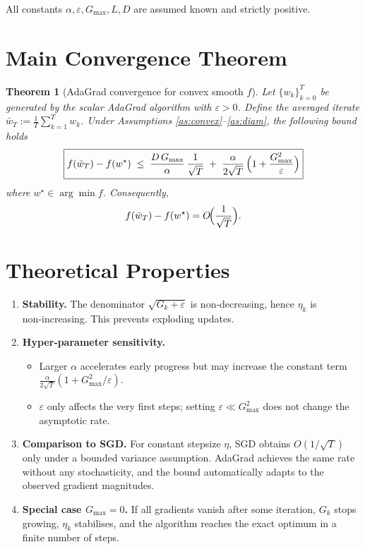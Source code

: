 \documentclass{article}
\newtheorem{theorem}{Theorem}
\begin{document}
All constants $\alpha,\varepsilon,G_{\max},L,D$ are assumed known and
strictly positive.

\section*{Main Convergence Theorem}
\begin{theorem}[AdaGrad convergence for convex smooth $f$]\label{thm:main}
Let $\{w_k\}_{k=0}^{T}$ be generated by the scalar AdaGrad algorithm with
$\varepsilon>0$.
Define the averaged iterate $\bar w_T:=\frac{1}{T}\sum_{k=1}^{T} w_k$.
Under Assumptions \ref{as:convex}–\ref{as:diam}, the following bound holds
\[
\boxed{
f(\bar w_T)-f(w^{\star})
\;\le\;
\frac{D\,G_{\max}}{\alpha}\,
\frac{1}{\sqrt{T}} \;+\;
\frac{\alpha}{2\sqrt{T}}\,
\Bigl(1+\frac{G_{\max}^{2}}{\varepsilon}\Bigr)
}
\]
where $w^{\star}\in\arg\min f$.
Consequently,
\[
f(\bar w_T)-f(w^{\star}) = O\!\Bigl(\frac{1}{\sqrt{T}}\Bigr).
\]
\end{theorem}

\section*{Theoretical Properties}
\begin{enumerate}[label=\arabic*.]
\item \textbf{Stability.} The denominator $\sqrt{G_k+\varepsilon}$ is non‑decreasing,
hence $\eta_k$ is non‑increasing. This prevents exploding updates.
\item \textbf{Hyper‑parameter sensitivity.}
\begin{itemize}
\item Larger $\alpha$ accelerates early progress but may increase the constant
term $\frac{\alpha}{2\sqrt{T}}(1+G_{\max}^{2}/\varepsilon)$.
\item $\varepsilon$ only affects the very first steps; setting $\varepsilon\ll G_{\max}^{2}$
does not change the asymptotic rate.
\end{itemize}
\item \textbf{Comparison to SGD.}
For constant stepsize $\eta$, SGD obtains $O(1/\sqrt{T})$ only under a
bounded variance assumption. AdaGrad achieves the same rate without
any stochasticity, and the bound automatically adapts to the observed
gradient magnitudes.
\item \textbf{Special case $G_{\max}=0$.}
If all gradients vanish after some iteration, $G_k$ stops growing,
$\eta_k$ stabilises, and the algorithm reaches the exact optimum in a
finite number of steps.
\end{enumerate}
\end{document}
